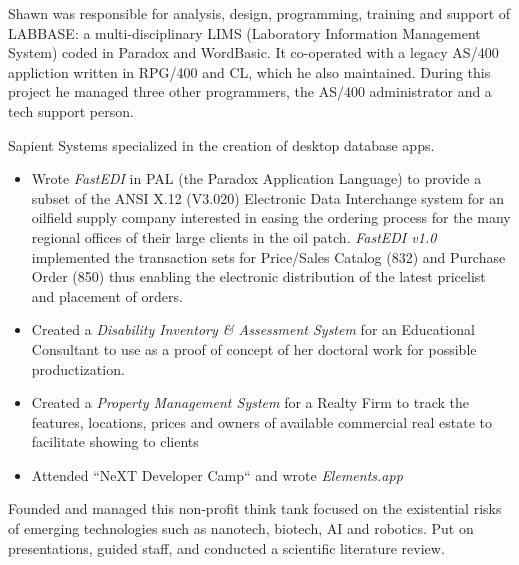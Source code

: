 \documentclass[line,margin,hidelinks]{res}
\begin{document}
\begin{resume}
\begin{position}
\end{position}


\begin{position}
  Shawn was responsible for analysis, design, programming,
  training and support of LABBASE: a multi-disciplinary LIMS
  (Laboratory Information Management System) coded in Paradox and
  WordBasic.  It co-operated with a legacy AS/400 appliction written
  in RPG/400 and CL, which he also maintained.  During this project he
  managed three other programmers, the AS/400 administrator and a tech
  support person.
\end{position}


\begin{position}
Sapient Systems specialized in the creation of desktop database apps.
\begin{itemize}
\item Wrote {\it FastEDI} in PAL (the Paradox Application Language)  to
	provide a subset of the
	ANSI X.12 (V3.020) Electronic Data Interchange system for an
	oilfield supply company interested in easing the ordering process for
	the many regional offices of their large clients in the oil patch.
	{\it FastEDI v1.0} implemented
	the transaction sets for Price/Sales Catalog (832) and
	Purchase Order (850) thus enabling the electronic distribution
	of the latest pricelist and placement of orders.
\item Created a {\it Disability Inventory \& Assessment System }
	for an Educational Consultant to use as a proof of concept of
	her doctoral work for possible productization.
\item Created a {\it Property Management System} for a Realty Firm to
	track the features, locations, prices and owners of
	available commercial real estate to facilitate showing to clients
\item Attended ``NeXT Developer Camp`` and wrote \emph{Elements.app}
\end{itemize}
\end{position}


\begin{position}
  Founded and managed this non-profit think tank focused on the existential
  risks of emerging technologies such as nanotech, biotech, AI and robotics.
  Put on presentations, guided staff, and conducted a scientific literature review.
\end{position}



\end{resume}
\end{document}
